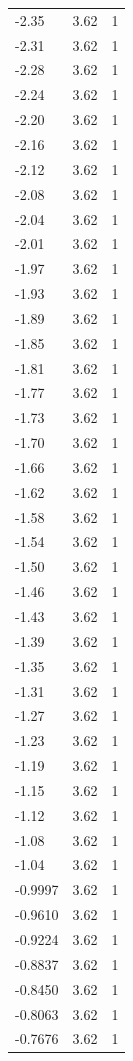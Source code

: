 \begin{longtable}{lrr}
  -2.35 & 3.62 & 1 \\
  -2.31 & 3.62 & 1 \\
  -2.28 & 3.62 & 1 \\
  -2.24 & 3.62 & 1 \\
  -2.20 & 3.62 & 1 \\
  -2.16 & 3.62 & 1 \\
  -2.12 & 3.62 & 1 \\
  -2.08 & 3.62 & 1 \\
  -2.04 & 3.62 & 1 \\
  -2.01 & 3.62 & 1 \\
  -1.97 & 3.62 & 1 \\
  -1.93 & 3.62 & 1 \\
  -1.89 & 3.62 & 1 \\
  -1.85 & 3.62 & 1 \\
  -1.81 & 3.62 & 1 \\
  -1.77 & 3.62 & 1 \\
  -1.73 & 3.62 & 1 \\
  -1.70 & 3.62 & 1 \\
  -1.66 & 3.62 & 1 \\
  -1.62 & 3.62 & 1 \\
  -1.58 & 3.62 & 1 \\
  -1.54 & 3.62 & 1 \\
  -1.50 & 3.62 & 1 \\
  -1.46 & 3.62 & 1 \\
  -1.43 & 3.62 & 1 \\
  -1.39 & 3.62 & 1 \\
  -1.35 & 3.62 & 1 \\
  -1.31 & 3.62 & 1 \\
  -1.27 & 3.62 & 1 \\
  -1.23 & 3.62 & 1 \\
  -1.19 & 3.62 & 1 \\
  -1.15 & 3.62 & 1 \\
  -1.12 & 3.62 & 1 \\
  -1.08 & 3.62 & 1 \\
  -1.04 & 3.62 & 1 \\
  -0.9997 & 3.62 & 1 \\
  -0.9610 & 3.62 & 1 \\
  -0.9224 & 3.62 & 1 \\
  -0.8837 & 3.62 & 1 \\
  -0.8450 & 3.62 & 1 \\
  -0.8063 & 3.62 & 1 \\
  -0.7676 & 3.62 & 1 \\

\end{longtable}
